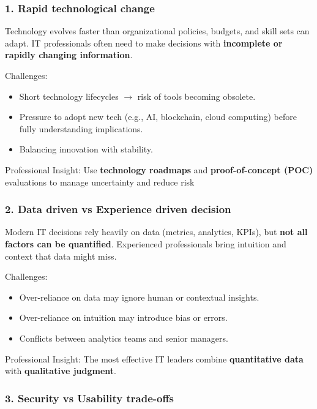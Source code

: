 \subsubsection{1. Rapid technological change}

\indent

Technology evolves faster than organizational policies, budgets, and skill sets can adapt. IT professionals often need to make decisions with \textbf{incomplete or rapidly changing information}.

Challenges:

\begin{itemize}
    \item Short technology lifecycles $\rightarrow$ risk of tools becoming obsolete.
    \item Pressure to adopt new tech (e.g., AI, blockchain, cloud computing) before fully understanding implications.
    \item Balancing innovation with stability.
\end{itemize}

Professional Insight: Use \textbf{technology roadmaps} and \textbf{proof-of-concept (POC)} evaluations to manage uncertainty and reduce risk

\subsubsection{2. Data driven vs Experience driven decision}

\indent 

Modern IT decisions rely heavily on data (metrics, analytics, KPIs), but \textbf{not all factors can be quantified}. Experienced professionals bring intuition and context that data might miss.

Challenges:

\begin{itemize}
    \item Over-reliance on data may ignore human or contextual insights.
    \item Over-reliance on intuition may introduce bias or errors.
    \item Conflicts between analytics teams and senior managers.
\end{itemize}

Professional Insight: The most effective IT leaders combine \textbf{quantitative data} with \textbf{qualitative judgment}.

\subsubsection{3. Security vs Usability trade-offs}

